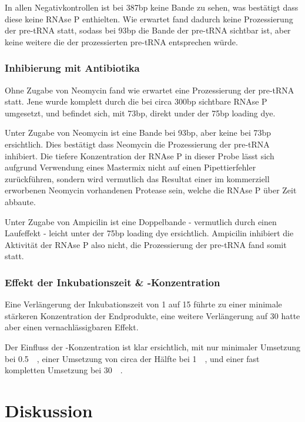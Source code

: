 \documentclass[a4paper,english]{scrreprt}
\begin{document}
In allen Negativkontrollen ist bei 387bp keine Bande zu sehen, was bestätigt
dass diese keine RNAse P enthielten. Wie erwartet fand dadurch keine
Prozessierung der pre-tRNA statt, sodass bei 93bp die Bande der pre-tRNA
sichtbar ist, aber keine weitere die der prozessierten pre-tRNA entsprechen
würde.

\subsection{Inhibierung mit Antibiotika}

Ohne Zugabe von Neomycin fand wie erwartet eine Prozessierung der pre-tRNA
statt. Jene wurde komplett durch die bei circa 300bp sichtbare RNAse P
umgesetzt, und befindet sich, mit 73bp, direkt under der 75bp loading dye.

Unter Zugabe von Neomycin ist eine Bande bei 93bp, aber keine bei 73bp
ersichtlich. Dies bestätigt dass Neomycin die Prozessierung der pre-tRNA
inhibiert. Die tiefere Konzentration der RNAse P in dieser Probe lässt sich
aufgrund Verwendung eines Mastermix nicht auf einen Pipettierfehler
zurückführen, sondern wird vermutlich das Resultat einer im kommerziell
erworbenen Neomycin vorhandenen Protease sein, welche die RNAse P über Zeit
abbaute.

Unter Zugabe von Ampicilin ist eine Doppelbande - vermutlich durch einen
Laufeffekt - leicht unter der 75bp loading dye ersichtlich. Ampicilin inhibiert
die Aktivität der RNAse P also nicht, die Prozessierung der pre-tRNA fand somit
statt.

\subsection{Effekt der Inkubationszeit \& -Konzentration}

Eine Verlängerung der Inkubationszeit von \SI{1}{\min} auf \SI{15}{\min} führte
zu einer minimale stärkeren Konzentration der Endprodukte, eine weitere
Verlängerung auf \SI{30}{\min} hatte aber einen vernachlässigbaren Effekt.

Der Einfluss der -Konzentration ist klar ersichtlich, mit nur minimaler
Umsetzung bei \SI{0.5}{\milli\Molar}, einer Umsetzung von circa der Hälfte bei
\SI{1}{\milli\Molar}, und einer fast kompletten Umsetzung bei
\SI{30}{\milli\Molar}.

\chapter{Diskussion}
\end{document}
